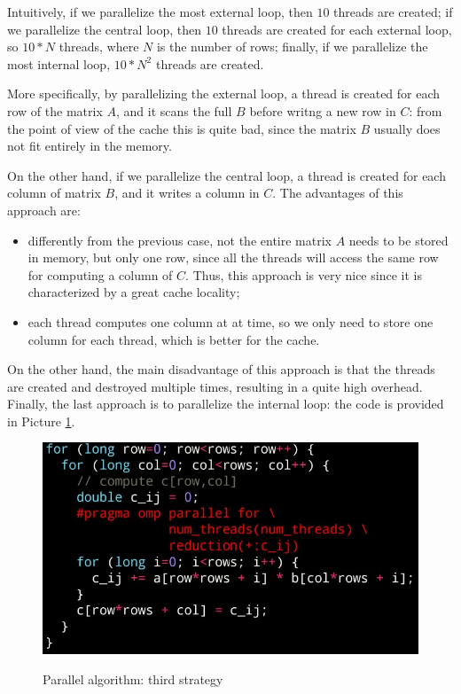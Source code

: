 Intuitively, if we parallelize the most external loop, then $10$ threads are created; if we parallelize the central loop, then $10$ threads are created for each external loop, so $10*N$ threads, where $N$ is the number of rows; finally, if we parallelize the most internal loop, $10*N^2$ threads are created. 

More specifically, by parallelizing the external loop, a thread is created for each row of the matrix $A$, and it scans the full $B$ before writng a new row in $C$: from the point of view of the cache this is quite bad, since the matrix $B$ usually does not fit entirely in the memory. 

On the other hand, if we parallelize the central loop, a thread is created for each column of matrix $B$, and it writes a column in $C$. The advantages of this approach are:

\begin{itemize}
    \item differently from the previous case, not the entire matrix $A$ needs to be stored in memory, but only one row, since all the threads will access the same row for computing a column of $C$. Thus, this approach is very nice since it is characterized by a great cache locality;
    \item each thread computes one column at at time, so we only need to store one column for each thread, which is better for the cache.
\end{itemize}

On the other hand, the main disadvantage of this approach is that the threads are created and destroyed multiple times, resulting in a quite high overhead. Finally, the last approach is to parallelize the internal loop: the code is provided in Picture \ref{par3}.

\begin{figure}[h!]
		\centering
		\includegraphics[scale = 1.6]{img/par3.jpg}
        \label{par3}
        \caption{Parallel algorithm: third strategy}
\end{figure}

